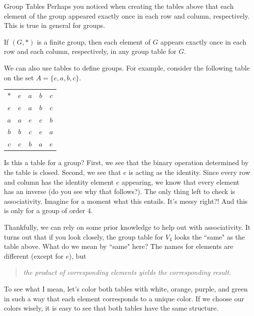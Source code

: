 \begin{section}{Group Tables}
Perhaps you noticed when creating the tables above that each element of the group appeared exactly once in each row and column, respectively.  This is true in general for groups.

\begin{theorem}
If $(G,*)$ is a finite group, then each element of $G$ appears exactly once in each row and each column, respectively, in any group table for $G$.
\end{theorem}

We can also use tables to define groups.  For example, consider the following table on the set $A=\{e,a,b,c\}$.

\begin{center}
\begin{tabular}{c!{\vrule width 2pt}c|c|c|c}
$*$ & $e$ & $a$ & $b$ & $c$ \\ 
$e$ & $e$ & $a$ & $b$ & $c$ \\
\hline $a$ & $a$ & $e$ & $c$ & $b$  \\
\hline $b$ & $b$ & $c$ & $e$ & $a$\\
\hline $c$ & $c$ & $b$ & $a$ & $e$
\end{tabular}
\end{center}

\noindent Is this a table for a group?  First, we see that the binary operation determined by the table is closed.  Second, we see that $e$ is acting as the identity.  Since every row and column has the identity element $e$ appearing, we know that every element has an inverse (do you see why that follows?).  The only thing left to check is associativity.  Imagine for a moment what this entails.  It's messy right?!  And this is only for a group of order 4.

Thankfully, we can rely on some prior knowledge to help out with associativity.  It turns out that if you look closely, the group table for $V_4$ looks the ``same" as the table above.  What do we mean by ``same" here?  The names for elements are different (except for $e$), but 
\begin{quotation}
\emph{the product of corresponding elements yields the corresponding result.}
\end{quotation}
To see what I mean, let's color both tables with white, {\color{cb-orange}orange}, {\color{cb-purple}purple}, and {\color{cb-green}green} in such a way that each element corresponds to a unique color.  If we choose our colors wisely, it is easy to see that both tables have the same structure.


\end{section}
